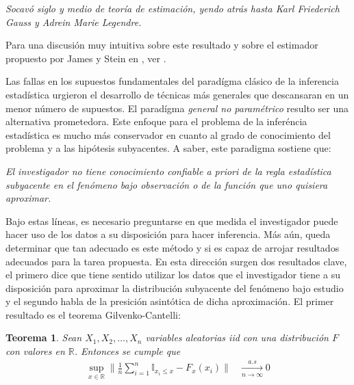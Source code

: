 \documentclass{book}
\theoremstyle{plain}
\newtheorem{thm}{Teorema}[section]
\theoremstyle{definition}
\theoremstyle{remark}
\begin{document}
\begin{changemargin}{1.5cm}{1.5cm}
\emph{Socavó siglo y medio de teoría de estimación, yendo atrás hasta Karl Friederich Gauss y Adrein Marie Legendre.}
\end{changemargin}

Para una discusión muy intuitiva sobre este resultado y sobre el estimador propuesto por James y Stein en \cite{STEIN2}, ver \cite{EFRON}. 

Las fallas en los supuestos fundamentales del paradígma clásico de la inferencia estadística urgieron el desarrollo de técnicas más generales que descansaran en un menor número de supuestos. El paradígma \emph{general no paramétrico} resulto ser una alternativa prometedora. Este enfoque para el problema de la inferéncia estadística  es mucho más conservador en cuanto al grado de conocimiento del problema y a las hipótesis subyacentes. A saber, este paradigma sostiene que:

\begin{changemargin}{1.5cm}{1.5cm}
\emph{El investigador no tiene conocimiento confiable a priori de la regla estadística subyacente en el fenómeno bajo observación o de la función que uno quisiera aproximar.}
\end{changemargin}

Bajo estas líneas, es necesario preguntarse en que medida el investigador puede hacer uso de los datos a su disposición para hacer inferencia. Más aún, queda determinar que tan adecuado es este método y si es capaz de arrojar resultados adecuados para la tarea propuesta. En esta dirección surgen dos resultados clave, el primero dice que tiene sentido utilizar los datos que el investigador tiene a su disposición para aproximar la distribución subyacente del fenómeno bajo estudio y el segundo habla de la presición asintótica de dicha aproximación. El primer resultado es el teorema  Gilvenko-Cantelli:

\bigskip

\begin{thm}
Sean $X_1,X_2,\dots,X_n$ variables aleatorias iid con una distribución $F$ con valores en $\mathbb{R}$. Entonces se cumple que
\begin{equation*}
\begin{split}
\displaystyle\sup_{x\in\mathbb{R}}\bigg\|\frac{1}{n}\displaystyle\sum_{i=1}^n\mathbb{I}_{x_i\leq x}-F_{x}(x_i)\bigg\| &\xrightarrow[n\rightarrow\infty]{a.s} 0
\end{split}
\end{equation*}
\end{thm}
\end{document}
